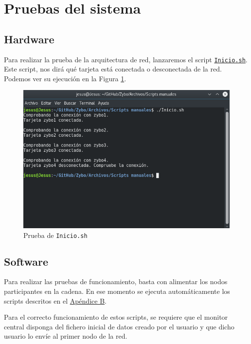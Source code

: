 \section{Pruebas del sistema}
\subsection{Hardware}
Para realizar la prueba de la arquitectura de red, lanzaremos el script \hyperlink{ScriptConexion}{\texttt{Inicio.sh}}. Este script, nos dirá qué tarjeta está conectada o desconectada de la red. Podemos ver su ejecución en la Figura \ref{Prueba de Inicio.sh}.

\begin{figure}[h]
	\centering
	\includegraphics[scale=0.5]{Metodologia/Pruebas/Prueba_Inicio_sh.png}
	\caption{Prueba de \texttt{Inicio.sh}}
	\label{Prueba de Inicio.sh}
\end{figure}

\subsection{Software}
Para realizar las pruebas de funcionamiento, basta con alimentar los nodos participantes en la cadena. En ese momento se ejecuta automáticamente los scripts descritos en el \hyperlink{Scripts}{Apéndice B}. 

Para el correcto funcionamiento de estos scripts, se requiere que el monitor central disponga del fichero inicial de datos creado por el usuario y que dicho usuario lo envíe al primer nodo de la red.

